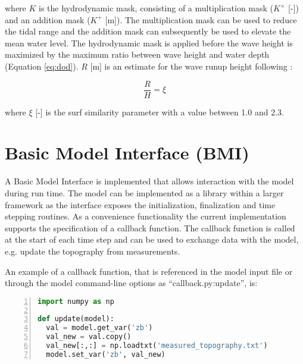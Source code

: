 \noindent where $K$ is the hydrodynamic mask, consisting of a
multiplication mask ($K^{\mathrm{\times}}$ [-]) and an addition mask
($K^{\mathrm{+}}$ [m]). The multiplication mask can be used to reduce
the tidal range and the addition mask can subsequently be used to
elevate the mean water level. The hydrodynamic mask is applied before
the wave height is maximized by the maximum ratio between wave height
and water depth (Equation \ref{eq:dod}). $R$ [m] is an estimate for
the wave runup height following \citet{Battjes1974}:

\begin{equation}
  \label{eq:battjes}
  \frac{R}{H} = \xi
\end{equation}

\noindent where $\xi$ [-] is the surf similarity parameter with a
value between 1.0 and 2.3.

\section{Basic Model Interface (BMI)}
\label{apx:bmi}

A Basic Model Interface \citep[BMI,][]{Peckham2013} is implemented
that allows interaction with the model during run time. The model can
be implemented as a library within a larger framework as the interface
exposes the initialization, finalization and time stepping
routines. As a convenience functionality the current implementation
supports the specification of a callback function. The callback
function is called at the start of each time step and can be used to
exchange data with the model, e.g. update the topography from
measurements.

An example of a callback function, that is referenced in the model
input file or through the model command-line options as
``callback.py:update'', is:

\begin{lstlisting}[language=Python,title=callback.py,frame=single,numbers=left]
import numpy as np

def update(model):
  val = model.get_var('zb')
  val_new = val.copy()
  val_new[:,:] = np.loadtxt('measured_topography.txt')
  model.set_var('zb', val_new)
\end{lstlisting}

